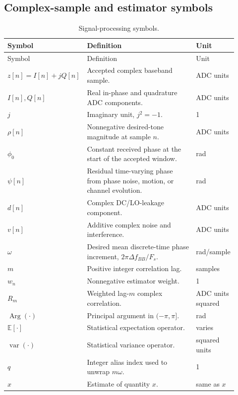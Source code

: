 \documentclass[10pt,a4paper]{article}
\newcommand{\E}{\mathbb{E}}
\newcommand{\Var}{\operatorname{var}}
\newcommand{\argp}{\operatorname{Arg}}
\begin{document}
\subsection{Complex-sample and estimator symbols}
\begin{longtable}{@{}p{0.22\linewidth}p{0.60\linewidth}p{0.10\linewidth}@{}}
\caption{Signal-processing symbols.}\\
\toprule Symbol & Definition & Unit \\
\midrule\endfirsthead
\toprule Symbol & Definition & Unit \\
\midrule\endhead
$z[n]=I[n]+jQ[n]$ & Accepted complex baseband sample. & ADC units\\
$I[n],Q[n]$ & Real in-phase and quadrature ADC components. & ADC units\\
$j$ & Imaginary unit, $j^2=-1$. & 1\\
$\rho[n]$ & Nonnegative desired-tone magnitude at sample $n$. & ADC units\\
$\phi_0$ & Constant received phase at the start of the accepted window. & rad\\
$\psi[n]$ & Residual time-varying phase from phase noise, motion, or channel evolution. & rad\\
$d[n]$ & Complex DC/LO-leakage component. & ADC units\\
$v[n]$ & Additive complex noise and interference. & ADC units\\
$\omega$ & Desired mean discrete-time phase increment, $2\pi\Delta f_{BB}/F_s$. & rad/sample\\
$m$ & Positive integer correlation lag. & samples\\
$w_n$ & Nonnegative estimator weight. & 1\\
$R_m$ & Weighted lag-$m$ complex correlation. & ADC units squared\\
$\argp(\cdot)$ & Principal argument in $(-\pi,\pi]$. & rad\\
$\E[\cdot]$ & Statistical expectation operator. & varies\\
$\Var(\cdot)$ & Statistical variance operator. & squared units\\
$q$ & Integer alias index used to unwrap $m\omega$. & 1\\
$\widehat{x}$ & Estimate of quantity $x$. & same as $x$\\
\bottomrule
\end{longtable}
\end{document}
